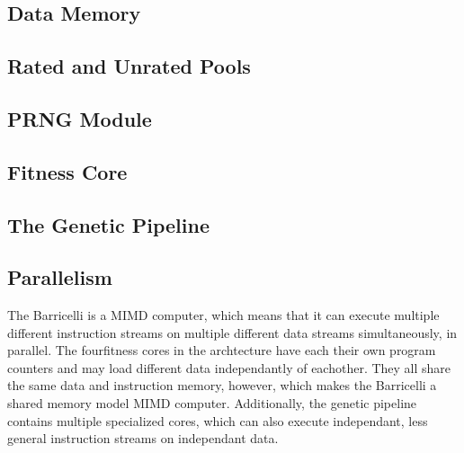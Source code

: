 \subsection{Data Memory}
\label{subsec:fpga-data-memory}


\subsection{Rated and Unrated Pools}


\subsection{PRNG Module}
    
 

\subsection{Fitness Core} \label{fpga:fitness:ss:design_of_the_fitness_core}
     \label{fpga:subsection:fitness_core}


\subsection{The Genetic Pipeline}
\label{fpga:subsection:genetic_pipeline}


\subsection{Parallelism}
The Barricelli is a MIMD computer, which means that it can execute multiple different instruction streams on multiple different data streams simultaneously, in parallel.
The four\cn fitness cores in the archtecture have each their own program counters and may load different data independantly of eachother.
They all share the same data and instruction memory, however, which makes the Barricelli a shared memory model MIMD computer.
Additionally, the genetic pipeline contains multiple specialized cores, which can also execute independant, less general instruction streams on independant data.

